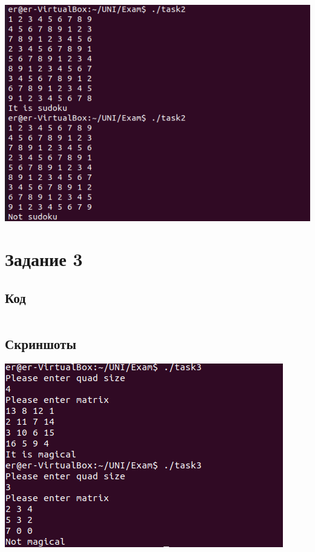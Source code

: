 \documentclass{article}
\begin{document}
        \includegraphics[scale=0.5]{task2/task2.png}

\pagebreak

\section{Задание 3}

    \subsection{Код}

        \inputminted[frame=single, fontsize=\small]{cpp}{task3/task3.cpp}

    \subsection{Скриншоты}

        \includegraphics[scale=0.5]{task3/task3.png}
\end{document}
